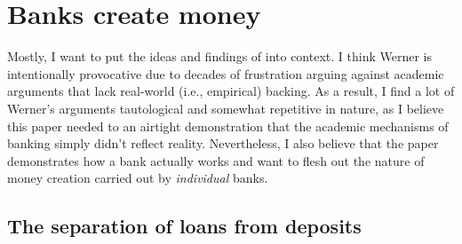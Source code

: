 \section{Banks create money}

Mostly, I want to put the ideas and findings of \cite{Werner2014} into context.  I think  Werner is intentionally provocative due to decades of frustration arguing against academic arguments that lack real-world (i.e., empirical) backing.  As a result, I find a lot of Werner's arguments tautological and somewhat repetitive in nature, as I believe this paper needed to an airtight demonstration that the academic mechanisms of banking simply didn't reflect reality.  Nevertheless, I also believe that the paper demonstrates how a bank actually works and want to flesh out the nature of money creation carried out by {\it individual} banks.


\subsection{The separation of loans from deposits}